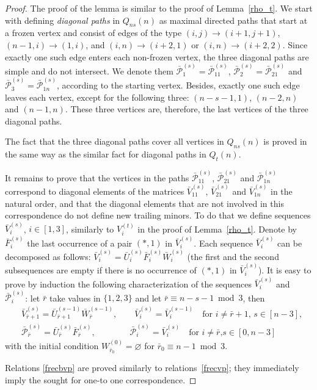 \documentclass{amsart}
\theoremstyle{definition}
\theoremstyle{remark}
\numberwithin{equation}{section}
\numberwithin{theorem}{section}
\begin{document}
\begin{proof} 
The proof of the lemma is similar to the proof of Lemma~\ref{rho_t}. We start with defining  {\em diagonal 
paths\/} in $Q_{ns}(n)$ as maximal directed paths that start at a
frozen vertex and consist of edges of the type $(i,j)\to (i+1,j+1)$, $(n-1,i)\to (1,i)$, and $(i, n) \to (i+2, 1)$ or $(i,n) \to (i+2,2)$. Since exactly one such edge enters each non-frozen
vertex, the three diagonal paths are simple and do not intersect. We denote them 
$\bar{{\mathcal P}}_1^{(s)}=\bar{{\mathcal P}}_{11}^{(s)}$, $\bar{{\mathcal P}}_2^{(s)}=\bar{{\mathcal P}}_{21}^{(s)}$ and 
$\bar{{\mathcal P}}_3^{(s)}=\bar{{\mathcal P}}_{1n}^{(s)}$,  according to the starting vertex. 
Besides, exactly one such edge
leaves each vertex, except for the following three: $(n-s-1,1)$, $(n-2,n)$ and $(n-1,n)$. 
These three vertices
are, therefore, the last vertices of the three diagonal paths. 

The fact that the three diagonal paths cover all vertices in $Q_{ns}(n)$ is proved in the same way as the
similar fact for diagonal paths in $Q_t(n)$. 

It remains to prove that the vertices in the paths  $\bar{{\mathcal P}}_{11}^{(s)}$, 
$\bar{{\mathcal P}}_{21}^{(s)}$ and $\bar{{\mathcal P}}_{1n}^{(s)}$ correspond to diagonal elements of the matrices $\bar V^{(s)}_{11}$, 
$\bar V^{(s)}_{21}$ and $\bar V^{(s)}_{1n}$ in the natural order,
and that the diagonal elements that are not involved in this correspondence do not define new trailing
minors. To do that we define sequences 
$\bar V_i^{(s)}$, $i\in [1,3]$,  similarly to $V_i^{(t)}$ in the proof of Lemma~\ref{rho_t}.
Denote by $\bar F^{(s)}_i$ the last occurrence of 
a pair $(*,1)$ in $\bar V^{(s)}_i$.  
Each sequence
$\bar V_i^{(s)}$ can be decomposed as follows: $\bar V^{(s)}_i=\bar U_i^{(s)}\bar F^{(s)}_i\bar W^{(s)}_i$ (the first and the second  
subsequences are empty if there is no occurrence of $(*,1)$ in $\bar V^{(s)}_i$). It is easy to prove by
induction the following characterization of the sequences $\bar V^{(s)}_i$ and $\bar{{\mathcal P}}^{(s)}_i$:
let $\bar r$ take values in $\{1,2,3\}$ and let $\bar r\equiv n-s-1\bmod 3$,  then
\begin{equation}\label{frecbvp}
\begin{aligned}
&\bar V^{(s)}_{\bar r+1}= \bar U^{(s-1)}_{\bar r+1}\bar W^{(s-1)}_{\bar r},\qquad \bar V^{(s)}_i= \bar V^{(s-1)}_i\quad \text{for $i\ne \bar r+1$, $s\in [n-3]$},\\
&\bar{{\mathcal P}}^{(s)}_{\bar r}= \bar U^{(s)}_{\bar r}\bar F^{(s)}_{\bar r},\qquad\qquad \bar{{\mathcal P}}^{(s)}_i= \bar V^{(s)}_i\quad \text{for $i\ne \bar r$,
$s\in [0,n-3]$}
\end{aligned}
\end{equation}
with the initial condition $W^{(0)}_{\bar r_0}=\varnothing$ for $\bar r_0\equiv n-1\bmod3$.

Relations \eqref{frecbvp} are proved similarly to relations~\eqref{frecvp}; they immediately
imply the sought for one-to one correspondence.
\end{proof}
\end{document}

